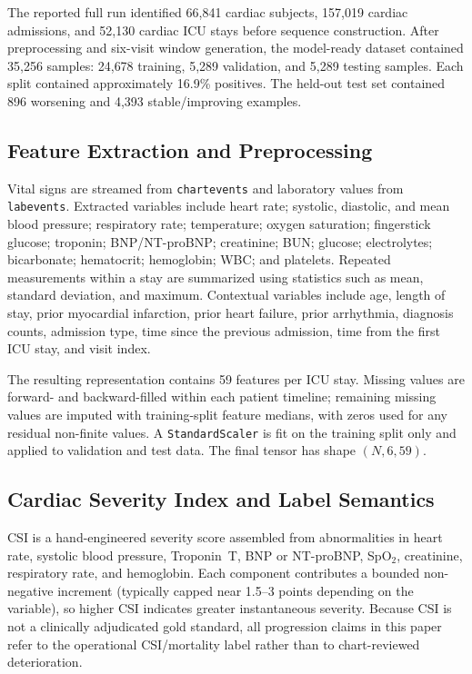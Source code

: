 \documentclass[conference]{IEEEtran}
\begin{document}
The reported full run identified 66{,}841 cardiac subjects, 157{,}019 cardiac admissions, and 52{,}130 cardiac ICU stays before sequence construction. After preprocessing and six-visit window generation, the model-ready dataset contained 35{,}256 samples: 24{,}678 training, 5{,}289 validation, and 5{,}289 testing samples. Each split contained approximately 16.9\% positives. The held-out test set contained 896 worsening and 4{,}393 stable/improving examples.

\subsection{Feature Extraction and Preprocessing}
Vital signs are streamed from \texttt{chartevents} and laboratory values from \texttt{labevents}. Extracted variables include heart rate; systolic, diastolic, and mean blood pressure; respiratory rate; temperature; oxygen saturation; fingerstick glucose; troponin; BNP/NT-proBNP; creatinine; BUN; glucose; electrolytes; bicarbonate; hematocrit; hemoglobin; WBC; and platelets. Repeated measurements within a stay are summarized using statistics such as mean, standard deviation, and maximum. Contextual variables include age, length of stay, prior myocardial infarction, prior heart failure, prior arrhythmia, diagnosis counts, admission type, time since the previous admission, time from the first ICU stay, and visit index.

The resulting representation contains 59 features per ICU stay. Missing values are forward- and backward-filled within each patient timeline; remaining missing values are imputed with training-split feature medians, with zeros used for any residual non-finite values. A \texttt{StandardScaler} is fit on the training split only and applied to validation and test data. The final tensor has shape $(N,6,59)$.

\subsection{Cardiac Severity Index and Label Semantics}
CSI is a hand-engineered severity score assembled from abnormalities in heart rate, systolic blood pressure, Troponin~T, BNP or NT-proBNP, SpO$_2$, creatinine, respiratory rate, and hemoglobin. Each component contributes a bounded non-negative increment (typically capped near 1.5--3 points depending on the variable), so higher CSI indicates greater instantaneous severity. Because CSI is not a clinically adjudicated gold standard, all progression claims in this paper refer to the operational CSI/mortality label rather than to chart-reviewed deterioration.
\end{document}
